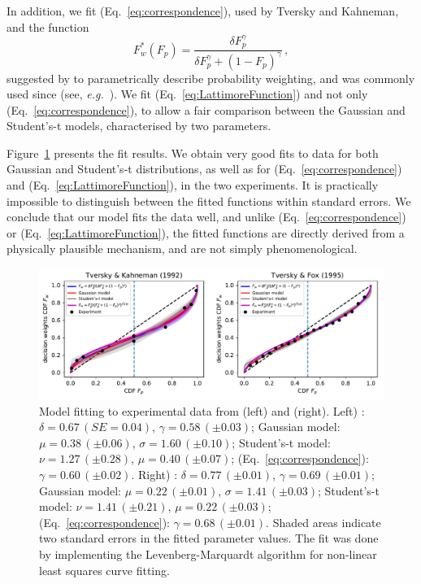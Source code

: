 \documentclass[a4paper, 12pt]{article}
\newcommand{\elabel}[1]{\label{eq:#1}}
\newcommand{\eref}[1]{(Eq.~\ref{eq:#1})}
\newcommand{\flabel}[1]{\label{fig:#1}}
\newcommand{\Fref}[1]{Figure~\ref{fig:#1}}
\newcommand{\eg}{{\it e.g.}\ }
\newcommand{\be}{\begin{equation}}
\newcommand{\ee}{\end{equation}}
\begin{document}
In addition, we fit \eref{correspondence}, used by Tversky and Kahneman, and the function
%
\be
F^*_w\left(F_p\right) =\frac{\delta F_p^{\gamma}}{\delta F_p^{\gamma} + \left(1-F_p\right)^{\gamma}}\,,
\elabel{LattimoreFunction}
\ee
%
suggested by \cite{LattimoreBakerWitte1992} to parametrically describe probability weighting, and was commonly used since (see, \eg \cite{tversky1995risk}). We fit \eref{LattimoreFunction} and not only \eref{correspondence}, to allow a fair comparison between the Gaussian and Student's-t models, characterised by two parameters.

\Fref{TK_TF_fit} presents the fit results. We obtain very good fits to data for both Gaussian and Student's-t distributions, as well as for \eref{correspondence} and \eref{LattimoreFunction}, in the two experiments. It is practically impossible to distinguish between the fitted functions within standard errors. We conclude that our model fits the data well, and unlike \eref{correspondence} or \eref{LattimoreFunction}, the fitted functions are directly derived from a physically plausible mechanism, and are not simply phenomenological.

\begin{figure}[htb]
\centering
\includegraphics[width=1.0\textwidth]{./figs/TK_TF_curvefit_withEq4.pdf}
\caption{Model fitting to experimental data from \cite{TverskyKahneman1992} (left) and \cite{TverskyFox1995} (right).
Left) \cite{LattimoreBakerWitte1992}: $\delta=0.67\,\left(SE = 0.04\right)$, $\gamma=0.58\,\left(\pm0.03\right)$; Gaussian model: $\mu=0.38\,\left(\pm0.06\right)$, $\sigma=1.60\,\left(\pm0.10\right)$; Student's-t model: $\nu=1.27\,\left(\pm0.28\right)$, $\mu=0.40\,\left(\pm0.07\right)$; \cite{TverskyKahneman1992} \eref{correspondence}: $\gamma=0.60\,\left(\pm0.02\right)$. Right) \cite{LattimoreBakerWitte1992}: $\delta=0.77\,\left(\pm0.01\right)$, $\gamma=0.69\,\left(\pm0.01\right)$; Gaussian model: $\mu=0.22\,\left(\pm0.01\right)$, $\sigma=1.41\,\left(\pm0.03\right)$; Student's-t model: $\nu=1.41\,\left(\pm0.21\right)$, $\mu=0.22\,\left(\pm0.03\right)$; \cite{TverskyKahneman1992} \eref{correspondence}: $\gamma=0.68\,\left(\pm0.01\right)$. Shaded areas indicate two standard errors in the fitted parameter values. The fit was done by implementing the Levenberg-Marquardt algorithm \cite{Levenberg1944} for non-linear least squares curve fitting.
}
\flabel{TK_TF_fit}
\end{figure}
\end{document}
